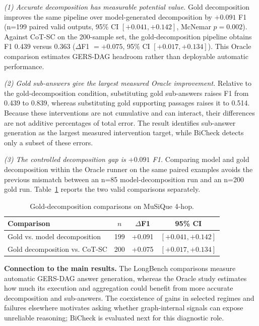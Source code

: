 \documentclass[letterpaper]{article} %
\begin{document}
\noindent\emph{(1) Accurate decomposition has measurable potential value.} Gold decomposition improves the same pipeline over model-generated decomposition by $+0.091$ F1 (n=199 paired valid outputs, 95\% CI $[+0.041,+0.142]$, McNemar $p{=}0.002$). Against CoT-SC on the 200-sample set, the gold-decomposition pipeline obtains F1 0.439 versus 0.363 ($\Delta$F1 $=+0.075$, 95\% CI $[+0.017,+0.134]$). This Oracle comparison estimates GERS-DAG headroom rather than deployable automatic performance.

\noindent\emph{(2) Gold sub-answers give the largest measured Oracle improvement.} Relative to the gold-decomposition condition, substituting gold sub-answers raises F1 from 0.439 to 0.839, whereas substituting gold supporting passages raises it to 0.514. Because these interventions are not cumulative and can interact, their differences are not additive percentages of total error. The result identifies sub-answer generation as the largest measured intervention target, while BiCheck detects only a subset of these errors.

\noindent\emph{(3) The controlled decomposition gap is $+0.091$ F1.} Comparing model and gold decomposition within the Oracle runner on the same paired examples avoids the previous mismatch between an n=85 model-decomposition run and an n=200 gold run. Table~\ref{tab:decomp_gap} reports the two valid comparisons separately.

\begin{table}[t]
\centering
\caption{Gold-decomposition comparisons on MuSiQue 4-hop.}
\label{tab:decomp_gap}
\small
\begin{tabular}{lccc}
\toprule
Comparison & $n$ & $\Delta$F1 & 95\% CI \\
\midrule
Gold vs. model decomposition & 199 & +0.091 & $[+0.041,+0.142]$ \\
Gold decomposition vs. CoT-SC & 200 & +0.075 & $[+0.017,+0.134]$ \\
\bottomrule
\end{tabular}
\end{table}

\noindent\textbf{Connection to the main results.} The LongBench comparisons measure automatic GERS-DAG answer generation, whereas the Oracle study estimates how much its execution and aggregation could benefit from more accurate decomposition and sub-answers. The coexistence of gains in selected regimes and failures elsewhere motivates asking whether graph-internal signals can expose unreliable reasoning; BiCheck is evaluated next for this diagnostic role.
\end{document}
